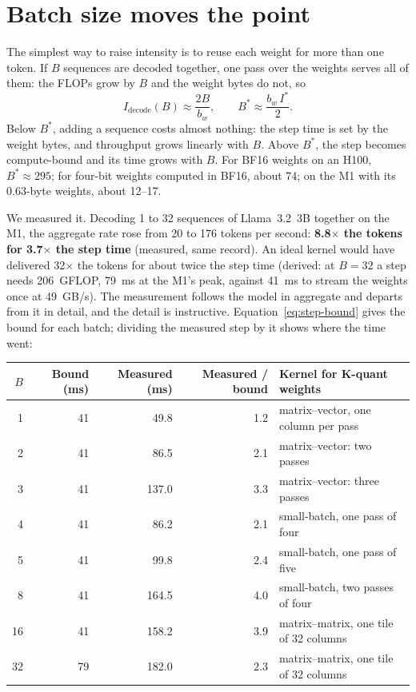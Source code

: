 \section{Batch size moves the point}

The simplest way to raise intensity is to reuse each weight for more than one
token. If $B$ sequences are decoded together, one pass over the weights serves
all of them: the FLOPs grow by $B$ and the weight bytes do not, so
\begin{equation}
I_{\text{decode}}(B) \approx \frac{2B}{b_w},
\qquad
B^{*} \approx \frac{b_w\, I^{*}}{2}.
\label{eq:batch-ridge}
\end{equation}
Below $B^{*}$, adding a sequence costs almost nothing: the step time is set by
the weight bytes, and throughput grows linearly with $B$. Above $B^{*}$, the
step becomes compute-bound and its time grows with $B$. For BF16 weights on an
H100, $B^{*}\approx 295$; for four-bit weights computed in BF16, about 74; on
the M1 with its 0.63-byte weights, about 12--17.

We measured it. Decoding 1 to 32 sequences of Llama~3.2~3B together on the
M1, the aggregate rate rose from 20 to 176 tokens per second: \textbf{8.8$\times$
the tokens for 3.7$\times$ the step time} (measured, same record). An ideal
kernel would have delivered 32$\times$ the tokens for about twice the step
time (derived: at $B=32$ a step needs 206~GFLOP, 79~ms at the M1's peak,
against 41~ms to stream the weights once at 49~GB/s). The measurement follows
the model in aggregate and departs from it in detail, and the detail is
instructive. Equation~\eqref{eq:step-bound} gives the bound for each batch;
dividing the measured step by it shows where the time went:

\begin{center}\small
\begin{tabular}{@{}rrrrl@{}}
\toprule
$B$ & Bound (ms) & Measured (ms) & Measured / bound & Kernel for K-quant weights \\
\midrule
1 & 41 & 49.8 & 1.2 & matrix--vector, one column per pass \\
2 & 41 & 86.5 & 2.1 & matrix--vector: two passes \\
3 & 41 & 137.0 & 3.3 & matrix--vector: three passes \\
4 & 41 & 86.2 & 2.1 & small-batch, one pass of four \\
5 & 41 & 99.8 & 2.4 & small-batch, one pass of five \\
8 & 41 & 164.5 & 4.0 & small-batch, two passes of four \\
16 & 41 & 158.2 & 3.9 & matrix--matrix, one tile of 32 columns \\
32 & 79 & 182.0 & 2.3 & matrix--matrix, one tile of 32 columns \\
\bottomrule
\end{tabular}
\end{center}

